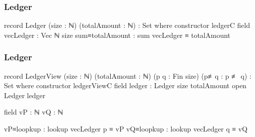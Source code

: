 \documentclass{beamer}
\begin{document}

\begin{frame}
  \frametitle{Ledger}
\begin{code}
record Ledger (size : ℕ) (totalAmount : ℕ) : Set where
  constructor ledgerC
  field
    vecLedger : Vec ℕ size
    sum≡totalAmount : sum vecLedger ≡ totalAmount
\end{code}
\end{frame}

\begin{frame}
  \frametitle{Ledger}
\begin{code}
record LedgerView (size : ℕ) (totalAmount : ℕ)
  (p q : Fin size) (p≢q : p ≢ q) : Set where
  constructor ledgerViewC
  field
    ledger : Ledger size totalAmount
  open Ledger ledger

  field
    vP : ℕ
    vQ : ℕ

    vP≡loopkup : lookup vecLedger p ≡ vP
    vQ≡loopkup : lookup vecLedger q ≡ vQ
\end{code}
\end{frame}
\end{document}
